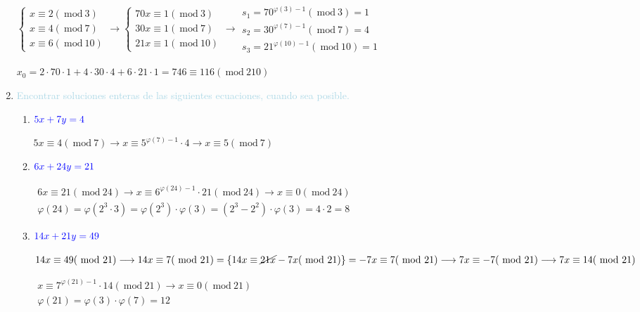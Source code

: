 \documentclass[12pt]{article}
\newcommand{\lb}[1]{\textcolor{lightblue}{#1}}
\newcommand{\db}[1]{\textcolor{blue}{#1}}
\renewcommand{\mod}{~\mathrm{mod}~}
\begin{document}
\begin{enumerate}[label=\color{red}\textbf{\arabic*)}, leftmargin=*]
        $\begin{cases}
        x\equiv2(\mod3)\\
        x\equiv4(\mod7)\\
        x\equiv6(\mod10)
        \end{cases}\longrightarrow\begin{cases}
        70x\equiv1(\mod3)\\
        30x\equiv1(\mod7)\\
        21x\equiv1(\mod10)
        \end{cases}\longrightarrow\begin{array}{l}
        s_1=70^{\varphi(3)-1}(\mod3)=1\\
        s_2=30^{\varphi(7)-1}(\mod 7)=4\\
        s_3=21^{\varphi(10)-1}(\mod10)=1
        \end{array}$
        
        $x_0=2\cdot70\cdot1+4\cdot30\cdot4+6\cdot21\cdot1=746\equiv116(\mod210)$
	\item \lb{Encontrar soluciones enteras de las siguientes ecuaciones, cuando sea posible.}
	\begin{enumerate}[label=\color{red}\alph*)]
		\item $\db{5x+7y=4}$
        
        $5x\equiv4(\mod7)\longrightarrow x\equiv5^{\varphi(7)-1}\cdot4\longrightarrow x\equiv5(\mod7)$
		\item $\db{6x+24y=21}$
        
        $\begin{array}{l}
        6x\equiv21(\mod24)\longrightarrow x\equiv6^{\varphi(24)-1}\cdot21(\mod24)\longrightarrow x\equiv 0(\mod24)\\
        \varphi(24)=\varphi(2^3\cdot3)=\varphi(2^3)\cdot\varphi(3)=(2^3-2^2)\cdot\varphi(3)=4\cdot2=8
        \end{array}$
		\item $\db{14x+21y=49}$
        
        $14x\equiv49(\mod21)\longrightarrow14x\equiv7(\mod21)=\left\{14x\equiv\cancel{21x}-7x(\mod21)\right\}=-7x\equiv7(\mod21)\longrightarrow7x\equiv-7(\mod21)\longrightarrow7x\equiv14(\mod21)$
        
        $\begin{array}{l}
        x\equiv7^{\varphi(21)-1}\cdot14(\mod21)\longrightarrow x\equiv0(\mod21)\\
        \varphi(21)=\varphi(3)\cdot\varphi(7)=12
        \end{array}$
        

\end{enumerate}
\end{enumerate}
\end{document}
